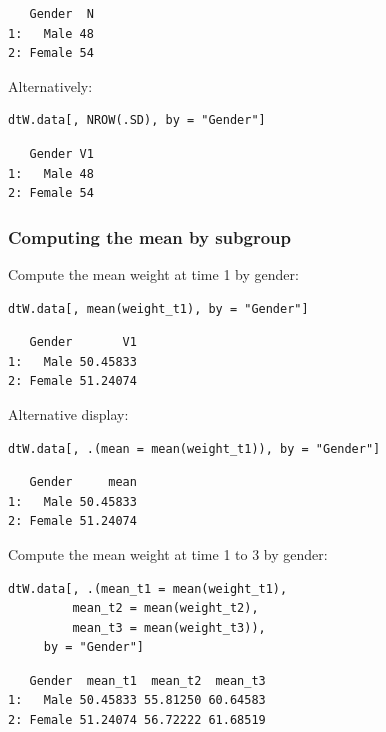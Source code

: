 \documentclass{article}
\begin{document}
\begin{verbatim}
   Gender  N
1:   Male 48
2: Female 54
\end{verbatim}

Alternatively:
\lstset{language=r,label= ,caption= ,captionpos=b,numbers=none}
\begin{lstlisting}
dtW.data[, NROW(.SD), by = "Gender"]
\end{lstlisting}

\begin{verbatim}
   Gender V1
1:   Male 48
2: Female 54
\end{verbatim}

\subsubsection{Computing the mean by subgroup}
\label{sec:org9e7ebbd}

Compute the mean weight at time 1 by gender:
\lstset{language=r,label= ,caption= ,captionpos=b,numbers=none}
\begin{lstlisting}
dtW.data[, mean(weight_t1), by = "Gender"]
\end{lstlisting}

\begin{verbatim}
   Gender       V1
1:   Male 50.45833
2: Female 51.24074
\end{verbatim}

Alternative display:
\lstset{language=r,label= ,caption= ,captionpos=b,numbers=none}
\begin{lstlisting}
dtW.data[, .(mean = mean(weight_t1)), by = "Gender"]
\end{lstlisting}

\begin{verbatim}
   Gender     mean
1:   Male 50.45833
2: Female 51.24074
\end{verbatim}

Compute the mean weight at time 1 to 3 by gender:
\lstset{language=r,label= ,caption= ,captionpos=b,numbers=none}
\begin{lstlisting}
dtW.data[, .(mean_t1 = mean(weight_t1),
	     mean_t2 = mean(weight_t2),
	     mean_t3 = mean(weight_t3)), 
	 by = "Gender"]
\end{lstlisting}

\begin{verbatim}
   Gender  mean_t1  mean_t2  mean_t3
1:   Male 50.45833 55.81250 60.64583
2: Female 51.24074 56.72222 61.68519
\end{verbatim}
\end{document}
